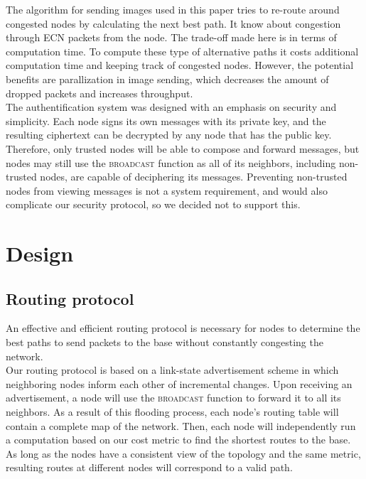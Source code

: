 \documentclass[letterpaper]{article}
\begin{document}
\noindent The algorithm for sending images used in this paper tries to re-route around congested nodes by calculating the next best path. It know about congestion through ECN packets from the node. The trade-off made here is in terms of computation time. To compute these type of alternative paths it costs additional computation time and keeping track of congested nodes. However, the potential benefits are parallization in image sending, which decreases the amount of dropped packets and increases throughput.
\\

\noindent The authentification system was designed with an emphasis on security and simplicity.
Each node signs its own messages with its private key, and the resulting ciphertext can be decrypted by any
node that has the public key. Therefore, only trusted nodes will be able to compose and forward messages, but
nodes may still use the \textsc{broadcast} function as all of its neighbors, including non-trusted nodes, are
capable of deciphering its messages. Preventing non-trusted nodes from viewing messages is not a system 
requirement, and would also complicate our security protocol, so we decided not to support this.

\section{Design}

\subsection{Routing protocol}

An effective and efficient routing protocol is necessary for nodes to determine the best paths to send
packets to the base without constantly congesting the network.
\\

\noindent Our routing protocol is based on a link-state advertisement scheme in which neighboring nodes 
inform each other of incremental changes. Upon receiving an advertisement, a node will use the 
\textsc{broadcast} function to forward it to all its neighbors. As a result of this flooding process,
each node's routing table will contain a complete map of the network. Then, each node will independently
run a computation based on our cost metric to find the shortest routes to the base. As long as the nodes
have a consistent view of the topology and the same metric, resulting routes at different nodes will
correspond to a valid path.
\end{document}
